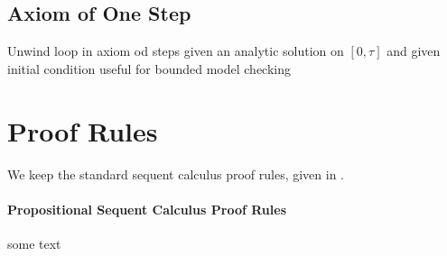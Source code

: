 \documentclass[10pt]{report}
\begin{document}
    \subsection{Axiom of One Step}
        \label{sex:axiom-of-one-step}

        Unwind loop in axiom od steps
        given an analytic solution on $[0,\tau]$ and given initial condition
        useful for bounded model checking

\section{Proof Rules}
    \label{sec:proof-rules}

    We keep the standard sequent calculus proof rules, given in \dL.

    \paragraph{Propositional Sequent Calculus Proof Rules}
        \label{sec:propositional-rules}

        some text

        \begin{calculus}

        \end{calculus}
\end{document}
